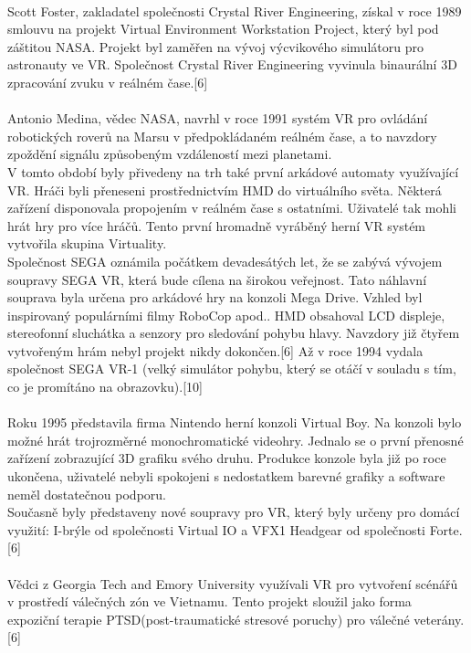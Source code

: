 \documentclass[a4paper, 12pt]{report}
\begin{document}
\\
Scott Foster, zakladatel společnosti Crystal River Engineering, získal v roce 1989 smlouvu na projekt Virtual Environment Workstation Project, který byl pod záštitou NASA. Projekt byl zaměřen na vývoj výcvikového simulátoru pro astronauty ve VR. Společnost Crystal River Engineering vyvinula binaurální 3D zpracování zvuku v reálném čase.[6]\\
\\
Antonio Medina, vědec NASA, navrhl v roce 1991 systém VR pro ovládání robotických roverů na Marsu v předpokládaném reálném čase, a to navzdory zpoždění signálu způsobeným vzdáleností mezi planetami.\\
V tomto období byly přivedeny na trh také první arkádové automaty využívající VR. Hráči byli přeneseni prostřednictvím HMD do virtuálního světa. Některá zařízení disponovala propojením v reálném čase s ostatními. Uživatelé tak mohli hrát hry pro více hráčů. Tento první hromadně vyráběný herní VR systém vytvořila skupina Virtuality.\\
Společnost SEGA oznámila počátkem devadesátých let, že se zabývá vývojem soupravy SEGA VR, která bude cílena na širokou veřejnost. Tato náhlavní souprava byla určena pro arkádové hry na konzoli Mega Drive. Vzhled byl inspirovaný populárními filmy RoboCop apod.. HMD obsahoval LCD displeje, stereofonní sluchátka a senzory pro sledování pohybu hlavy. Navzdory již čtyřem vytvořeným hrám nebyl projekt nikdy dokončen.[6] Až v roce 1994 vydala společnost SEGA VR-1 (velký simulátor pohybu, který se otáčí v souladu s tím, co je promítáno na obrazovku).[10]\\
\\
Roku 1995 představila firma Nintendo herní konzoli Virtual Boy. Na konzoli bylo možné hrát trojrozměrné monochromatické videohry. Jednalo se o první přenosné zařízení zobrazující 3D grafiku svého druhu. Produkce konzole byla již po roce ukončena, uživatelé nebyli spokojeni s nedostatkem barevné grafiky a software neměl dostatečnou podporu.\\
Současně byly představeny nové soupravy pro VR, který byly určeny pro domácí využití: I-brýle od společnosti Virtual IO a VFX1 Headgear od společnosti Forte. [6]\\
\\
Vědci z Georgia Tech and Emory University využívali VR pro vytvoření scénářů v prostředí válečných zón ve Vietnamu. Tento projekt sloužil jako forma expoziční terapie PTSD(post-traumatické stresové poruchy) pro válečné veterány.[6]\\
\end{document}

